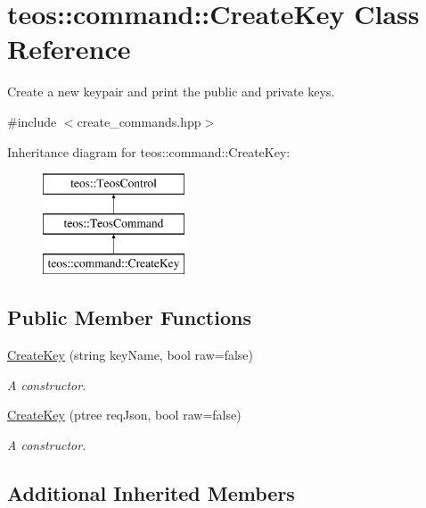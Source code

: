 \hypertarget{classteos_1_1command_1_1_create_key}{}\section{teos\+:\+:command\+:\+:Create\+Key Class Reference}
\label{classteos_1_1command_1_1_create_key}


Create a new keypair and print the public and private keys.  




{\ttfamily \#include $<$create\+\_\+commands.\+hpp$>$}

Inheritance diagram for teos\+:\+:command\+:\+:Create\+Key\+:\begin{figure}[H]
\begin{center}
\leavevmode
\includegraphics[height=3.000000cm]{classteos_1_1command_1_1_create_key}
\end{center}
\end{figure}
\subsection*{Public Member Functions}
\begin{DoxyCompactItemize}
\item 
\mbox{\hyperlink{classteos_1_1command_1_1_create_key_ae9e618a4fb36a19c804ad6f4625edd6b}{Create\+Key}} (string key\+Name, bool raw=false)
\begin{DoxyCompactList}\small\item\em A constructor. \end{DoxyCompactList}\item 
\mbox{\hyperlink{classteos_1_1command_1_1_create_key_a8d4fc54928a448593975d013db30d9e6}{Create\+Key}} (ptree req\+Json, bool raw=false)
\begin{DoxyCompactList}\small\item\em A constructor. \end{DoxyCompactList}\end{DoxyCompactItemize}
\subsection*{Additional Inherited Members}


